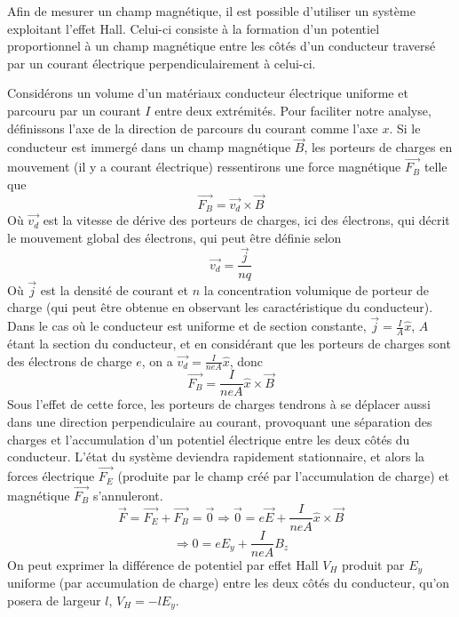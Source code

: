 \documentclass{standalone}
\author{Bastien Gauthier-Soumis,\\
 Edward Halle-Hannan, ,\\
Massine Kadi, ,\\
Félix Pelletier, }
\begin{document}
Afin de mesurer un champ magnétique, il est possible d'utiliser un système exploitant l'effet Hall. Celui-ci consiste à la formation d'un potentiel proportionnel à un champ magnétique entre les côtés d'un conducteur traversé par un courant électrique perpendiculairement à celui-ci.

Considérons un volume d'un matériaux conducteur électrique uniforme et parcouru par un courant $I$ entre deux extrémités. Pour faciliter notre analyse, définissons l'axe de la direction de parcours du courant comme l'axe $x$. Si le conducteur est immergé dans un champ magnétique $\vec{B}$, les porteurs de charges en mouvement (il y a courant électrique) ressentirons une force magnétique $\vec{F_B}$ telle que
\begin{equation*}
\vec{F_B} = \vec{v_d}\times \vec{B}
\end{equation*}
Où $\vec{v_d}$ est la vitesse de dérive des porteurs de charges, ici des électrons, qui décrit le mouvement global des électrons, qui peut être définie selon
\begin{equation*}
\vec{v_d} = \frac{\vec{j}}{nq}
\end{equation*}
Où $\vec{j}$ est la densité de courant et $n$ la concentration volumique de porteur de charge (qui peut être obtenue en observant les caractéristique du conducteur). Dans le cas où le conducteur est uniforme et de section constante, $\vec{j}=\frac{I}{A}\hat{x}$, $A$ étant la section du conducteur, et en considérant que les porteurs de charges sont des électrons de charge $e$, on a $\vec{v_d} = \frac{I}{neA}\hat{x}$, donc
\begin{equation*}
\vec{F_B} = \frac{I}{neA}\hat{x}\times \vec{B}
\end{equation*}
Sous l'effet de cette force, les porteurs de charges tendrons à se déplacer aussi dans une direction perpendiculaire au courant, provoquant une séparation des charges et l'accumulation d'un potentiel électrique entre les deux côtés du conducteur. L'état du système deviendra rapidement stationnaire, et alors la forces électrique $\vec{F_E}$ (produite par le champ créé par l'accumulation de charge) et magnétique $\vec{F_B}$ s'annuleront.
\begin{equation*}
\vec{F}=\vec{F_E}+\vec{F_B}=\vec{0} \Rightarrow \vec{0}=e\vec{E}+\frac{I}{neA}\hat{x}\times \vec{B}
\end{equation*}
\begin{equation*}
\Rightarrow 0=eE_y+\frac{I}{neA}B_z
\end{equation*}
On peut exprimer la différence de potentiel  par effet Hall $V_H$ produit par $E_y$ uniforme (par accumulation de charge) entre les deux côtés du conducteur, qu'on posera de largeur $l$, $V_H = -lE_y$.
\end{document}
